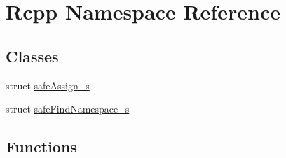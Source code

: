 \hypertarget{namespaceRcpp}{
\section{Rcpp Namespace Reference}
\label{namespaceRcpp}
}
\subsection*{Classes}
\begin{DoxyCompactItemize}
\item 
struct \hyperlink{structRcpp_1_1safeAssign__s}{safeAssign\_\-s}
\item 
struct \hyperlink{structRcpp_1_1safeFindNamespace__s}{safeFindNamespace\_\-s}
\end{DoxyCompactItemize}
\subsection*{Functions}

